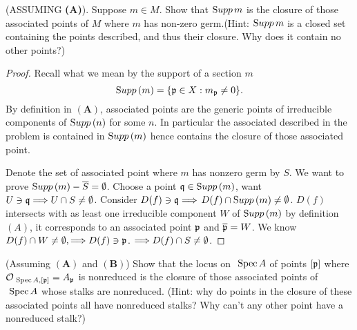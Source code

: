 \begin{exr}
(ASSUMING \textbf{(A)}). Suppose $m \in M$. Show that ${\text Supp\thinspace} m$ is the closure of those associated points of $M$ where $m$ has non-zero germ.(Hint: ${\text Supp\thinspace} m$ is a closed set containing the points described, and thus their closure. Why does it contain no other points?)
\end{exr}
\begin{proof}
Recall what we mean by the support of a section $m$
$$
{\text Supp\thinspace}(m)=\{{\mathfrak p}\in X:m_{{\mathfrak p}}\neq 0\}.
$$
By definition in $\mathbf{(A)}$, associated points are the generic points of irreducible components of ${\text Supp\thinspace}(n)$ for some $n$. In particular the associated described in the problem is contained in ${\text Supp\thinspace}(m)$ hence contains the closure of those associated point.

Denote the set of associated point where $m$ has nonzero germ by $S$. We want to prove ${\text Supp\thinspace}(m)-\overline{S}=\emptyset$. Choose a point $\mathfrak q\in {\text Supp\thinspace}(m)$, want $U\ni\mathfrak q\Longrightarrow U\cap S\neq \emptyset$. Consider $D(f)\ni \mathfrak q\Longrightarrow$ $D(f)\cap {\text Supp\thinspace}(m)\neq \emptyset$. $D(f)$ intersects with as least one irreducible component $W$ of ${\text Supp\thinspace}(m)$ by definition $(A)$, it corresponds to an associated point ${\mathfrak p}$ and $\overline{{\mathfrak p}}=W$. We know $D(f)\cap W\neq \emptyset,\Longrightarrow D(f)\ni {\mathfrak p}$. $\Longrightarrow D(f)\cap S\neq \emptyset$.
\end{proof}
\begin{exr}(Assuming $\mathbf{(A)}$ and $\mathbf{(B)}$)
Show that the locus on $\text{ Spec\,} A$ of points $[{\mathfrak p}]$ where ${\cal O}_{\text{ Spec\,} A,[{\mathfrak p}]} = A_{\mathfrak p}$ is nonreduced is the closure of those associated points of $\text{ Spec\,} A$ whose stalks are nonreduced. (Hint: why do points in the closure of these associated points all have nonreduced stalks? Why can’t any other point have a nonreduced stalk?)
\end{exr}
